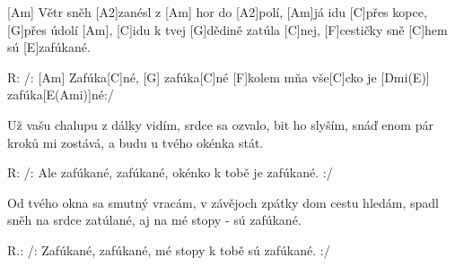 
[Am] Větr sněh [A2]zanésl z [Am] hor do [A2]polí,
[Am]já idu [C]přes kopce, [G]přes údolí [Am],
[C]idu k tvej [G]dědině zatúla [C]nej,
[F]cestičky sně [C]hem sú [E]zafúkané.

R: /: [Am] Zafúka[C]né, [G] zafúka[C]né 
[F]kolem mňa vše[C]cko je [Dmi(E)] zafúka[E(Ami)]né:/

Už vašu chalupu z dálky vidím,
srdce sa ozvalo, bit ho slyším,
snáď enom pár kroků mi zostává,
a budu u tvého okénka stát.

R: /: Ale zafúkané, zafúkané,
okénko k tobě je zafúkané. :/

Od tvého okna sa smutný vracám,
v závějoch zpátky dom cestu hledám,
spadl sněh na srdce zatúlané,
aj na mé stopy - sú zafúkané.

R.: /: Zafúkané, zafúkané,
mé stopy k tobě sú zafúkané. :/ 

